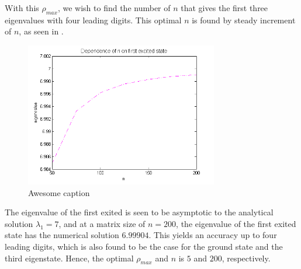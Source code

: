 With this $\rho_{max}$, we wish to find the number of $n$ that gives the first three eigenvalues with four leading digits. 
This optimal $n$ is found by steady increment of $n$, as seen in .
\begin{figure}[H]
	\centering
	\includegraphics[width=0.75\textwidth]{Figures/MatrixSizeOnEigenvalue_2state.png}
	\caption{Awesome caption}
	\label{fig:DependenceOnEigenvalue2}
\end{figure}
The eigenvalue of the first exited is seen to be asymptotic to the analytical solution $\lambda_1 = 7$, and at a matrix size of $n=200$,  the eigenvalue of the first exited state has the numerical solution $6.99904$. 
This yields an accuracy up to four leading digits, which is also found to be the case for the ground state and the third eigenstate.
Hence, the optimal $\rho_{max}$ and $n$ is $5$ and $200$, respectively. 
